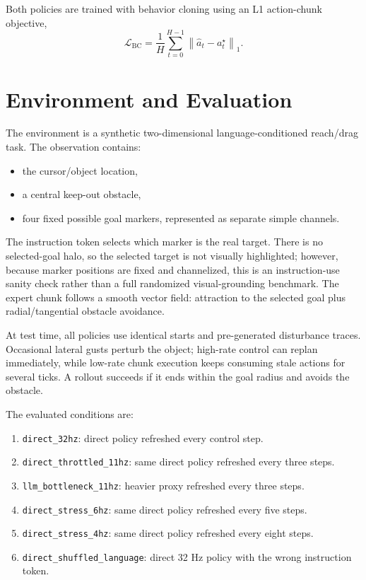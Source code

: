 \documentclass[11pt]{article}
\begin{document}
Both policies are trained with behavior cloning using an L1 action-chunk objective,
\[
  \mathcal{L}_{\mathrm{BC}} = \frac{1}{H}\sum_{t=0}^{H-1}\left\|\hat{a}_t-a_t^{\star}\right\|_1.
\]

\section{Environment and Evaluation}

The environment is a synthetic two-dimensional language-conditioned reach/drag task. The observation contains:
\begin{itemize}[leftmargin=1.5em]
  \item the cursor/object location,
  \item a central keep-out obstacle,
  \item four fixed possible goal markers, represented as separate simple channels.
\end{itemize}
The instruction token selects which marker is the real target. There is no selected-goal halo, so the selected target is not visually highlighted; however, because marker positions are fixed and channelized, this is an instruction-use sanity check rather than a full randomized visual-grounding benchmark. The expert chunk follows a smooth vector field: attraction to the selected goal plus radial/tangential obstacle avoidance.

At test time, all policies use identical starts and pre-generated disturbance traces. Occasional lateral gusts perturb the object; high-rate control can replan immediately, while low-rate chunk execution keeps consuming stale actions for several ticks. A rollout succeeds if it ends within the goal radius and avoids the obstacle.

The evaluated conditions are:
\begin{enumerate}[leftmargin=1.5em]
  \item \texttt{direct\_32hz}: direct policy refreshed every control step.
  \item \texttt{direct\_throttled\_11hz}: same direct policy refreshed every three steps.
  \item \texttt{llm\_bottleneck\_11hz}: heavier proxy refreshed every three steps.
  \item \texttt{direct\_stress\_6hz}: same direct policy refreshed every five steps.
  \item \texttt{direct\_stress\_4hz}: same direct policy refreshed every eight steps.
  \item \texttt{direct\_shuffled\_language}: direct 32 Hz policy with the wrong instruction token.
\end{enumerate}
\end{document}
